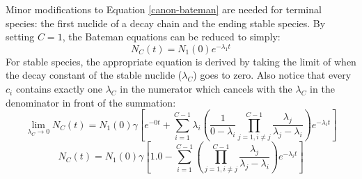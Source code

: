 \documentclass[letterpaper]{physor2018}
\begin{document}
Minor modifications to Equation \ref{canon-bateman} are needed for terminal species:
the first nuclide of a decay chain and the ending stable species. By setting $C=1$, the Bateman
equations can be reduced to simply:
\begin{equation}
\label{n-single}
N_C(t) = N_1(0) e^{-\lambda_1 t}
\end{equation}
For stable species, the appropriate equation is derived by taking the limit
of when the decay constant of the stable nuclide ($\lambda_C$) goes to
zero. Also notice that every $c_i$ contains exactly one $\lambda_C$
in the numerator which cancels with the $\lambda_C$ in the denominator
in front of the summation:
\begin{equation}
\label{stable-lim}
\lim_{\lambda_C \to 0} N_C(t) = N_1(0)  \gamma \left[e^{-0t} + \sum_{i=1}^{C-1} \lambda_i \left(\frac{1}{0 - \lambda_i} \prod_{j=1,i\ne j}^{C-1} \frac{\lambda_j}{\lambda_j - \lambda_i} \right) e^{-\lambda_i t} \right]
\end{equation}
\begin{equation}
\label{n-stable}
N_C(t) = N_1(0)  \gamma \left[1.0 - \sum_{i=1}^{C-1} \left(\prod_{j=1,i\ne j}^{C-1} \frac{\lambda_j}{\lambda_j - \lambda_i} \right) e^{-\lambda_i t} \right]
\end{equation}
\end{document}

